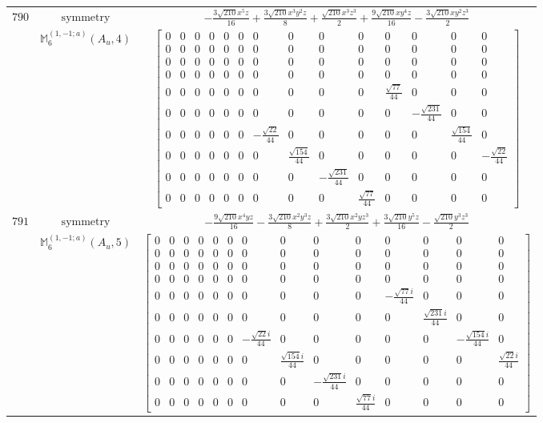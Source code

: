 \documentclass[fleqn,8pt,landscape]{jsarticle}
\begin{document}
\begin{longtable}{ccc}
$ 790 $ & $ \text{symmetry} $ & $ - \frac{3 \sqrt{210} x^{5} z}{16} + \frac{3 \sqrt{210} x^{3} y^{2} z}{8} + \frac{\sqrt{210} x^{3} z^{3}}{2} + \frac{9 \sqrt{210} x y^{4} z}{16} - \frac{3 \sqrt{210} x y^{2} z^{3}}{2} $ \\
$  $ & $ \mathbb{M}_{6}^{(1,-1;a)}(A_{u},4) $ & $ \begin{bmatrix} 0 & 0 & 0 & 0 & 0 & 0 & 0 & 0 & 0 & 0 & 0 & 0 & 0 & 0 \\ 0 & 0 & 0 & 0 & 0 & 0 & 0 & 0 & 0 & 0 & 0 & 0 & 0 & 0 \\ 0 & 0 & 0 & 0 & 0 & 0 & 0 & 0 & 0 & 0 & 0 & 0 & 0 & 0 \\ 0 & 0 & 0 & 0 & 0 & 0 & 0 & 0 & 0 & 0 & 0 & 0 & 0 & 0 \\ 0 & 0 & 0 & 0 & 0 & 0 & 0 & 0 & 0 & 0 & \frac{\sqrt{77}}{44} & 0 & 0 & 0 \\ 0 & 0 & 0 & 0 & 0 & 0 & 0 & 0 & 0 & 0 & 0 & - \frac{\sqrt{231}}{44} & 0 & 0 \\ 0 & 0 & 0 & 0 & 0 & 0 & - \frac{\sqrt{22}}{44} & 0 & 0 & 0 & 0 & 0 & \frac{\sqrt{154}}{44} & 0 \\ 0 & 0 & 0 & 0 & 0 & 0 & 0 & \frac{\sqrt{154}}{44} & 0 & 0 & 0 & 0 & 0 & - \frac{\sqrt{22}}{44} \\ 0 & 0 & 0 & 0 & 0 & 0 & 0 & 0 & - \frac{\sqrt{231}}{44} & 0 & 0 & 0 & 0 & 0 \\ 0 & 0 & 0 & 0 & 0 & 0 & 0 & 0 & 0 & \frac{\sqrt{77}}{44} & 0 & 0 & 0 & 0 \end{bmatrix} $ \\ \hline
$ 791 $ & $ \text{symmetry} $ & $ - \frac{9 \sqrt{210} x^{4} y z}{16} - \frac{3 \sqrt{210} x^{2} y^{3} z}{8} + \frac{3 \sqrt{210} x^{2} y z^{3}}{2} + \frac{3 \sqrt{210} y^{5} z}{16} - \frac{\sqrt{210} y^{3} z^{3}}{2} $ \\
$  $ & $ \mathbb{M}_{6}^{(1,-1;a)}(A_{u},5) $ & $ \begin{bmatrix} 0 & 0 & 0 & 0 & 0 & 0 & 0 & 0 & 0 & 0 & 0 & 0 & 0 & 0 \\ 0 & 0 & 0 & 0 & 0 & 0 & 0 & 0 & 0 & 0 & 0 & 0 & 0 & 0 \\ 0 & 0 & 0 & 0 & 0 & 0 & 0 & 0 & 0 & 0 & 0 & 0 & 0 & 0 \\ 0 & 0 & 0 & 0 & 0 & 0 & 0 & 0 & 0 & 0 & 0 & 0 & 0 & 0 \\ 0 & 0 & 0 & 0 & 0 & 0 & 0 & 0 & 0 & 0 & - \frac{\sqrt{77} i}{44} & 0 & 0 & 0 \\ 0 & 0 & 0 & 0 & 0 & 0 & 0 & 0 & 0 & 0 & 0 & \frac{\sqrt{231} i}{44} & 0 & 0 \\ 0 & 0 & 0 & 0 & 0 & 0 & - \frac{\sqrt{22} i}{44} & 0 & 0 & 0 & 0 & 0 & - \frac{\sqrt{154} i}{44} & 0 \\ 0 & 0 & 0 & 0 & 0 & 0 & 0 & \frac{\sqrt{154} i}{44} & 0 & 0 & 0 & 0 & 0 & \frac{\sqrt{22} i}{44} \\ 0 & 0 & 0 & 0 & 0 & 0 & 0 & 0 & - \frac{\sqrt{231} i}{44} & 0 & 0 & 0 & 0 & 0 \\ 0 & 0 & 0 & 0 & 0 & 0 & 0 & 0 & 0 & \frac{\sqrt{77} i}{44} & 0 & 0 & 0 & 0 \end{bmatrix} $ \\ \hline

\end{longtable}
\end{document}
